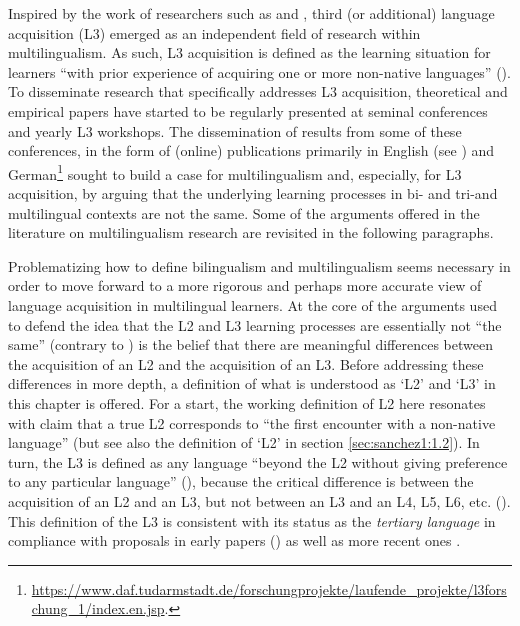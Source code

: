 \documentclass[output=paper,colorlinks,citecolor=brown,nonflat]{langsci/langscibook}
\begin{document}
 Inspired by the work of researchers such as \citet{Hufeisen1998, Hufeisen2003} and \citet{DeAngelis2007}, third (or additional) language acquisition (L3) emerged as an independent field of research within multilingualism. As such, L3 acquisition is defined as the learning situation for learners “with prior experience of acquiring one or more non-native languages” (\citealt[128]{Hammarberg2018}). To disseminate research that specifically addresses L3 acquisition, theoretical and empirical papers have started to be regularly presented at seminal conferences and yearly L3 workshops. The dissemination of results from some of these conferences, in the form of (online) publications primarily in English (see \citealt{CenozEtAl2001}) and German\footnote{\url{https://www.daf.tudarmstadt.de/forschungprojekte/laufende_projekte/l3forschung_1/index.en.jsp}{.}} sought to build a case for multilingualism and, especially, for L3 acquisition, by arguing that the underlying learning processes in bi- and tri-and multilingual contexts are not the same. Some of the arguments offered in the literature on multilingualism research are revisited in the following paragraphs.

Problematizing how to define bilingualism and multilingualism seems necessary in order to move forward to a more rigorous and perhaps more accurate view of language acquisition in multilingual learners. At the core of the arguments used to defend the idea that the L2 and L3 learning processes are essentially not “the same” (contrary to \citealt{MitchellMyles1998}) is the belief that there are meaningful differences between the acquisition of an L2 and the acquisition of an L3. Before addressing these differences in more depth, a definition of what is understood as ‘L2’ and ‘L3’ in this chapter is offered. For a start, the working definition of L2 here resonates with  claim that a true L2 corresponds to “the first encounter with a non-native language” (but see also the definition of ‘L2’ in section \ref{sec:sanchez1:1.2}). In turn, the L3 is defined as any language “beyond the L2 without giving preference to any particular language” (\citealt[11]{DeAngelis2007}), because the critical difference is between the acquisition of an L2 and an L3, but not between an L3 and an L4, L5, L6, etc. (\citealt{Hammarberg2001, Hufeisen2003, DeAngelis2007}). This definition of the L3 is consistent with its status as the \textit{tertiary language} in compliance with proposals in early papers (\citealt{LindemannHufeisen1998, DentlerEtAl2000}) as well as more recent ones \citep{Hammarberg2018}.
\end{document}
